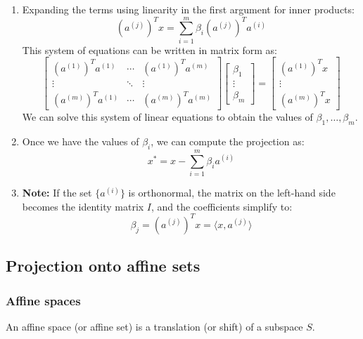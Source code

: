 \begin{derivation}
\begin{enumerate}
            \item Expanding the terms using linearity in the first argument for inner products:
            \[
            (a^{(j)})^T x = \sum_{i=1}^{m} \beta_i (a^{(j)})^T a^{(i)}
            \]
            This system of equations can be written in matrix form as:
            \[
            \begin{bmatrix}
            (a^{(1)})^T a^{(1)} & \cdots & (a^{(1)})^T a^{(m)} \\
            \vdots & \ddots & \vdots \\
            (a^{(m)})^T a^{(1)} & \cdots & (a^{(m)})^T a^{(m)}
            \end{bmatrix}
            \begin{bmatrix}
            \beta_1 \\
            \vdots \\
            \beta_m
            \end{bmatrix}
            =
            \begin{bmatrix}
            (a^{(1)})^T x \\
            \vdots \\
            (a^{(m)})^T x
            \end{bmatrix}
            \]
            We can solve this system of linear equations to obtain the values of $\beta_1, \dots, \beta_m$.
            
            \item Once we have the values of $\beta_i$, we can compute the projection as:
            \[
            x^* = x - \sum_{i=1}^{m} \beta_i a^{(i)}
            \]
            
            \item \textbf{Note:} If the set $\{a^{(i)}\}$ is orthonormal, the matrix on the left-hand side becomes the identity matrix $I$, and the coefficients simplify to:
            \[
            \beta_j = (a^{(j)})^T x = \langle x, a^{(j)} \rangle
            \]
        \end{enumerate}
    \end{derivation}

\subsection{Projection onto affine sets}
\subsubsection{Affine spaces}
\begin{definition}
    An affine space (or affine set) is a translation (or shift) of a subspace $S$.
\end{definition}

